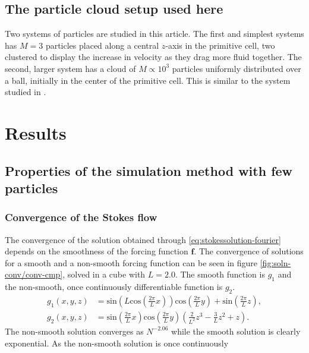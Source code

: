 \documentclass[a4paper,
twoside=false,abstract=false,numbers=noenddot,
titlepage=false,headings=small,parskip=half,version=last]{scrartcl}
\begin{document}
\subsection{The particle cloud setup used here}

Two systems of particles are studied in this article.
The first and simplest systems has $M=3$ particles placed along a central $z$-axis in the primitive cell, two clustered to display the increase in velocity as they drag more fluid together.
The second, larger system has a cloud of $M\propto 10^3$ particles uniformly distributed over a ball, initially in the center of the primitive cell. This is similar to the system studied in \cite{fallingclouds}.

\section{Results}

\subsection{Properties of the simulation method with few particles}

\subsubsection{Convergence of the Stokes flow}
The convergence of the solution obtained through \eqref{eq:stokessolution-fourier} depends on the smoothness of the forcing function $\mathbf{f}$.
The convergence of solutions for a smooth and a non-smooth forcing function can be seen in figure \ref{fig:soln-conv/conv-cmp}, solved in a cube with $L=2.0$.
The smooth function is $g_1$ and the non-smooth, once continuously differentiable function is $g_2$.
\begin{align}
g_1(x,y,z) &= \text{sin}(L\text{cos}(\frac{2\pi}{L}x))\text{cos}(\frac{2\pi}{L}y) + \text{sin}(\frac{2\pi}{L}z),\nonumber\\
g_2(x,y,z) &= \text{sin}(\frac{2\pi}{L}x)\text{cos}(\frac{2\pi}{L}y)(\frac{2}{L^2}z^3 - \frac{3}{L} z^2 + z).\nonumber
\end{align}
The non-smooth solution converges as $N^{-2.06}$ while the smooth solution is clearly exponential.
As the non-smooth solution is once continuously 

\end{document}

